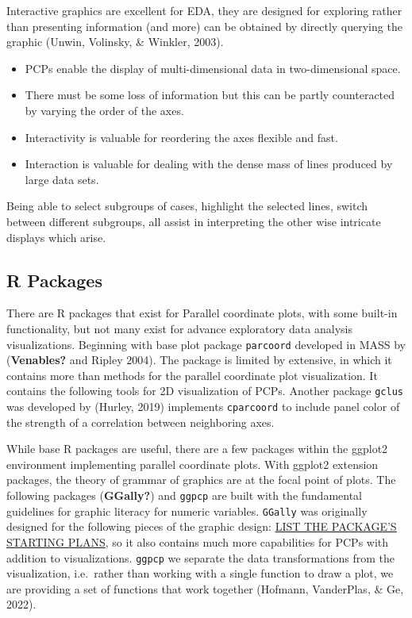 \documentclass[print]{nuthesis}
\providecommand{\tightlist}{%
  \setlength{\itemsep}{0pt}\setlength{\parskip}{0pt}}
\begin{document}
Interactive graphics are excellent for EDA, they are designed for exploring rather than presenting information (and more) can be obtained by directly querying the graphic (Unwin, Volinsky, \& Winkler, 2003).

\begin{itemize}
\tightlist
\item
  PCPs enable the display of multi-dimensional data in two-dimensional space.
\item
  There must be some loss of information but this can be partly counteracted by varying the order of the axes.
\item
  Interactivity is valuable for reordering the axes flexible and fast.
\item
  Interaction is valuable for dealing with the dense mass of lines produced by large data sets.
\end{itemize}

Being able to select subgroups of cases, highlight the selected lines, switch between different subgroups, all assist in interpreting the other wise intricate displays which arise.

\hypertarget{r-packages}{%
\subsection{R Packages}\label{r-packages}}

There are R packages that exist for Parallel coordinate plots, with some built-in functionality, but not many exist for advance exploratory data analysis visualizations. Beginning with base plot package \texttt{parcoord} developed in MASS by (\textbf{Venables?} and Ripley 2004). The package is limited by extensive, in which it contains more than methods for the parallel coordinate plot visualization. It contains the following tools for 2D visualization of PCPs. Another package \texttt{gclus} was developed by (Hurley, 2019) implements \texttt{cparcoord} to include panel color of the strength of a correlation between neighboring axes.

While base R packages are useful, there are a few packages within the ggplot2 environment implementing parallel coordinate plots. With ggplot2 extension packages, the theory of grammar of graphics are at the focal point of plots. The following packages (\textbf{GGally?}) and \texttt{ggpcp} are built with the fundamental guidelines for graphic literacy for numeric variables. \texttt{GGally} was originally designed for the following pieces of the graphic design: \href{}{LIST THE PACKAGE'S STARTING PLANS}, so it also contains much more capabilities for PCPs with addition to visualizations. \texttt{ggpcp} we separate the data transformations from the visualization, i.e.~rather than working with a single function to draw a plot, we are providing a set of functions that work together (Hofmann, VanderPlas, \& Ge, 2022).
\end{document}
